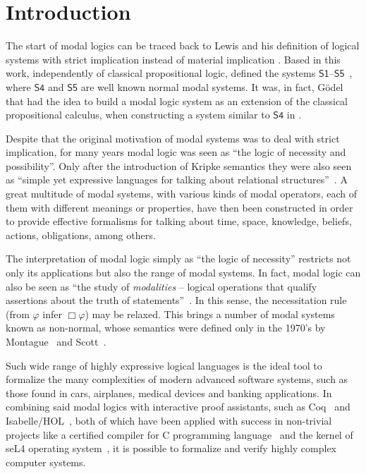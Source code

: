\documentclass[sigconf]{acmart}
\begin{document}
\maketitle

\section{Introduction}\label{sec:intro}


The start of modal logics can be traced back to Lewis and his definition of 
logical systems with strict implication instead of material implication \cite{Lewis1918}.
Based in this work, independently of classical propositional logic,
defined the systems $\mathsf{S1}$--$\mathsf{S5}$~\cite{Lewis1932}, where $\mathsf{S4}$ and $\mathsf{S5}$
are well known normal modal systems. It was, in fact, G{\"o}del that had the idea 
to build a modal logic system as an extension of the classical propositional calculus, 
when constructing a system similar to $\mathsf{S4}$ in \cite{Godel1933}.

Despite that the original motivation of modal systems was to deal with strict implication, 
for many years modal logic was seen as ``the logic of necessity and possibility''. 
Only after the introduction of Kripke semantics they were also seen as ``simple yet
expressive languages for talking about relational structures''~\cite{Blackburn-ModalLogics}. 
A great multitude of modal systems, with various kinds of modal operators, each of them with 
different meanings or properties, have then been constructed in order to provide effective
formalisms for talking about time, space, knowledge, beliefs, actions, 
obligations, among others.

The interpretation of modal logic simply as ``the logic of necessity'' restricts 
not only its applications but also the range of modal systems. In fact, modal logic 
can also be seen as ``the study of \emph{modalities} -- logical operations that qualify 
assertions about the truth of statements''~\cite{Goldblatt-MathofModality}. In this sense, 
the necessitation rule (from $\varphi$ infer $\Box\varphi$) may be relaxed. This brings 
a number of modal systems known as non-normal, whose semantics were defined only in the 
1970's by Montague~\cite{Montague1970} and Scott~\cite{Scott_AdviceModal1970}.

Such wide range of highly expressive logical languages is the ideal tool to 
formalize the many complexities of modern advanced software systems, 
such as those found in cars, airplanes, medical devices and banking applications.
In combining said modal logics with interactive proof assistants,
such as Coq~\cite{manual_coq} and Isabelle/HOL~\cite{manual_isabelle}, both of
which have been applied with success in non-trivial projects like a certified compiler 
for C programming language~\cite{Leroy09} and the kernel of seL4 operating
system~\cite{Klein10}, it is possible to formalize and verify highly complex computer
systems.
\end{document}
